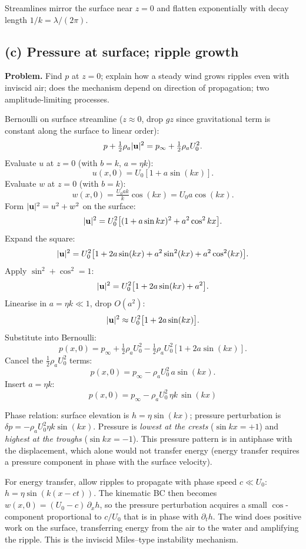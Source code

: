 \documentclass[11pt]{article}
\begin{document}
Streamlines mirror the surface near $z=0$ and flatten exponentially with decay length $1/k = \lambda/(2\pi)$.

\subsection*{(c) Pressure at surface; ripple growth}

\textbf{Problem.} Find $p$ at $z=0$; explain how a steady wind grows ripples even with inviscid air; does the mechanism depend on direction of propagation; two amplitude-limiting processes.

Bernoulli on surface streamline ($z\approx 0$, drop $gz$ since gravitational term is constant along the surface to linear order):
\[
p + \tfrac{1}{2}\rho_a |\vb u|^2 = p_\infty + \tfrac{1}{2}\rho_a U_0^2.
\]
Evaluate $u$ at $z=0$ (with $b=k$, $a=\eta k$):
\[
u(x,0) = U_0[1 + a\sin(kx)].
\]
Evaluate $w$ at $z=0$ (with $b=k$):
\[
w(x,0) = \tfrac{U_0 a k}{k}\cos(kx) = U_0 a\cos(kx).
\]
Form $|\vb u|^2 = u^2 + w^2$ on the surface:
\[
|\vb u|^2 = U_0^2\bigl[(1 + a\sin kx)^2 + a^2\cos^2 kx\bigr].
\]
Expand the square:
\[
|\vb u|^2 = U_0^2\bigl[1 + 2a\sin(kx) + a^2\sin^2(kx) + a^2\cos^2(kx)\bigr].
\]
Apply $\sin^2+\cos^2 = 1$:
\[
|\vb u|^2 = U_0^2\bigl[1 + 2a\sin(kx) + a^2\bigr].
\]
Linearise in $a = \eta k \ll 1$, drop $O(a^2)$:
\[
|\vb u|^2 \approx U_0^2\bigl[1 + 2a\sin(kx)\bigr].
\]
Substitute into Bernoulli:
\[
p(x,0) = p_\infty + \tfrac{1}{2}\rho_a U_0^2 - \tfrac{1}{2}\rho_a U_0^2[1 + 2a\sin(kx)].
\]
Cancel the $\tfrac{1}{2}\rho_a U_0^2$ terms:
\[
p(x,0) = p_\infty - \rho_a U_0^2\,a\sin(kx).
\]
Insert $a = \eta k$:
\[
\boxed{\;p(x,0) = p_\infty - \rho_a U_0^2\,\eta k\,\sin(kx)\;}
\]

Phase relation: surface elevation is $h = \eta\sin(kx)$; pressure perturbation is $\delta p = -\rho_a U_0^2 \eta k\sin(kx)$. Pressure is \emph{lowest at the crests} ($\sin kx = +1$) and \emph{highest at the troughs} ($\sin kx = -1$). This pressure pattern is in antiphase with the displacement, which alone would not transfer energy (energy transfer requires a pressure component in phase with the surface velocity).

For energy transfer, allow ripples to propagate with phase speed $c\ll U_0$: $h = \eta\sin(k(x - ct))$. The kinematic BC then becomes $w(x,0) = (U_0 - c)\,\partial_x h$, so the pressure perturbation acquires a small $\cos$-component proportional to $c/U_0$ that is in phase with $\partial_t h$. The wind does positive work on the surface, transferring energy from the air to the water and amplifying the ripple. This is the inviscid Miles--type instability mechanism.
\end{document}

